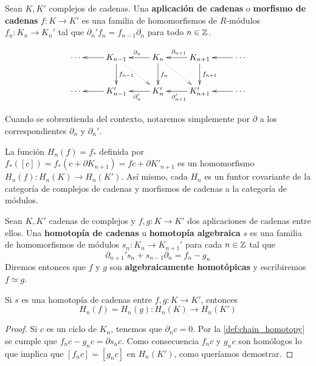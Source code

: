 \begin{definicion}
	Sean $K,K'$ complejos de cadenas. Una \textbf{aplicación de cadenas} o \textbf{morfismo de cadenas} $f: K \rightarrow K'$ es una familia de homomorfismos de $R$-módulos $f_n: K_n \rightarrow K_n'$ tal que $\partial_n'f_n = f_{n-1}\partial_n$ para todo $n \in \mathbb{Z}$.
\end{definicion}

\begin{equation}
	\label{chaincomplex}
	\xymatrix{
		\cdots & K_{n-1} \ar[l] \ar[d]^{f_{n-1}} \ar@{..>}[dr] & K_n \ar[l]_{\partial_{n}} \ar[d]^{f_n} \ar@{..>}[dr] & K_{n+1} \ar[l]_{\partial_{n+1}} \ar[d]^{f_{n+1}} & \cdots \ar[l] \\
		\cdots & K'_{n-1} \ar[l] & K'_n \ar[l]^{\partial'_{n}} & K'_{n+1} \ar[l]^{\partial'_{n+1}} & \cdots \ar[l]
    }
\end{equation}

Cuando se sobrentienda del contexto, notaremos simplemente por $\partial$ a los correspondientes $\partial_n$ y $\partial_n'$.

La función $H_n(f) = f_*$ definida por $f_*([c]) = f_*(c + \partial K_{n+1}) = fc + \partial K'_{n+1}$ es un homomorfismo $H_n(f): H_n(K) \rightarrow H_n(K')$. Así mismo, cada $H_n$ es un funtor covariante de la categoría de complejos de cadenas y morfismos de cadenas a la categoría de módulos.

\begin{definicion}
	\label{def:chain_homotopy}
	Sean $K,K'$ cadenas de complejos y $f,g: K \rightarrow K'$ dos aplicaciones de cadenas entre ellos. Una \textbf{homotopía de cadenas} u \textbf{homotopía algebraica} $s$ es una familia de homomorfismos de módulos $s_n: K_n \rightarrow K_{n+1}'$ para cada $n \in \mathbb{Z}$ tal que
	\begin{equation}
		\partial_{n+1}'s_n + s_{n-1} \partial_n = f_n - g_n
	\end{equation}
	Diremos entonces que $f$ y $g$ son \textbf{algebraicamente homotópicas} y escribiremos $f \simeq g$.
\end{definicion}

\begin{teorema}
	Si $s$ es una homotopía de cadenas entre $f,g: K \rightarrow K'$, entonces
	\[ H_n(f) = H_n(g) : H_n(K) \rightarrow H_n(K') \]
\end{teorema}
\begin{proof}
	Si $c$ es un ciclo de $K_n$, tenemos que $\partial_n c = 0$. Por la \autoref{def:chain_homotopy} se cumple que $f_nc-g_nc =  \partial s_n c$. Como consecuencia $f_n c$ y $g_n c$ son homólogos lo que implica que $[f_n c] = [g_n c]$ en $H_n(K')$, como queríamos demostrar.
\end{proof}

